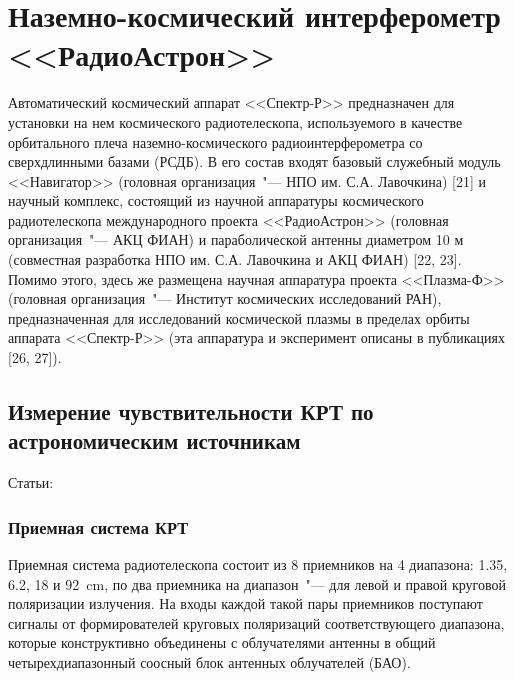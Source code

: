 \graphicspath{{Dissertation/images/chapt2/}}

\chapter{Наземно-космический интерферометр <<РадиоАстрон>>} \label{chapt2}

Автоматический космический аппарат <<Спектр-Р>> предназначен для установки на нем космического
радиотелескопа, используемого в качестве орбитального плеча наземно-космического
радиоинтерферометра со сверхдлинными базами (РСДБ). В его состав входят базовый служебный модуль
<<Навигатор>> (головная организация~"--- НПО им. С.А. Лавочкина) [21] и научный комплекс, состоящий
из научной аппаратуры космического радиотелескопа международного проекта <<РадиоАстрон>> (головная
организация~"--- АКЦ ФИАН) и параболической антенны диаметром 10 м (совместная разработка НПО им.
С.А. Лавочкина и АКЦ ФИАН) [22, 23]. Помимо этого, здесь же размещена научная аппаратура проекта
<<Плазма-Ф>> (головная организация~"--- Институт космических исследований РАН), предназначенная для
исследований космической плазмы в пределах орбиты аппарата <<Спектр-Р>> (эта аппаратура и
эксперимент описаны в публикациях [26, 27]).



\section{Измерение чувствительности КРТ по астрономическим источникам}

Статьи: \cite{Kardashev_2013_rus, Kovalev_2014_rus}

\subsection{Приемная система КРТ}

Приемная система радиотелескопа состоит из 8 приемников на 4 диапазона: 1.35, 6.2, 18 и
\SI{92}{\cm}, по два приемника на диапазон~"--- для левой и правой круговой поляризации излучения.
На
входы каждой такой пары приемников поступают сигналы от формирователей круговых поляризаций
соответствующего диапазона, которые конструктивно объединены с облучателями антенны в общий
четырехдиапазонный соосный блок антенных облучателей (БАО).

